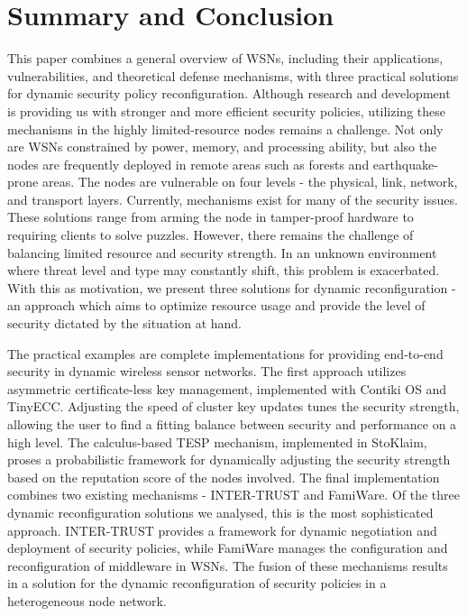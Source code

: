 \documentclass[12pt,a4paper,twoside]{report}
\begin{document}
\section{Summary and Conclusion}
\label{sec:conclusion}
This paper combines a general overview of WSNs, including their applications, vulnerabilities, and theoretical defense mechanisms, with three practical solutions for dynamic security policy reconfiguration.
Although research and development is providing us with stronger and more efficient security policies, utilizing these mechanisms in the highly limited-resource nodes remains a challenge. Not only are WSNs constrained by power, memory, and processing ability, but also the nodes are frequently deployed in remote areas such as forests and earthquake-prone areas. The nodes are vulnerable on four levels - the physical, link, network, and transport layers. 
Currently, mechanisms exist for many of the security issues. These solutions range from arming the node in tamper-proof hardware to requiring clients to solve puzzles. However, there remains the challenge of balancing limited resource and security strength. In an unknown environment where threat level and type may constantly shift, this problem is exacerbated. 
With this as motivation, we present three solutions for dynamic reconfiguration - an approach which aims to optimize resource usage and provide the level of security dictated by the situation at hand.\par
The practical examples are complete implementations for providing end-to-end security in dynamic wireless sensor networks.
The first approach utilizes asymmetric certificate-less key management, implemented with Contiki OS and TinyECC. Adjusting the speed of cluster key updates tunes the security strength, allowing the user to find a fitting balance between security and performance on a high level. 
The calculus-based TESP mechanism, implemented in StoKlaim, proses a probabilistic framework for dynamically adjusting the security strength based on the reputation score of the nodes involved. 
The final implementation combines two existing mechanisms - INTER-TRUST and FamiWare. Of the three dynamic reconfiguration solutions we analysed, this is the most sophisticated approach. INTER-TRUST provides a framework for dynamic negotiation and deployment of security policies, while FamiWare manages the configuration and reconfiguration of middleware in WSNs. The fusion of these mechanisms results in a solution for the dynamic reconfiguration of security policies in a heterogeneous node network. \par
\end{document}
